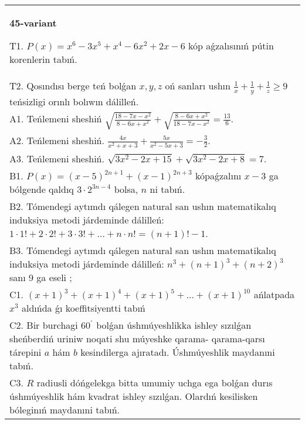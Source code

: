 \documentclass{article}
\begin{document}
\begin{tabular}{m{17cm}}
\textbf{45-variant}
\newline

T1. \(P(x) = x^{6} - 3x^{5} + x^{4} - 6x^{2} + 2x - 6\) kóp aǵzalısınıń pútin korenlerin tabıń. \\
T2. Qosındısı berge teń bolǵan \(x,y,z\) oń sanları ushın \(\frac{1}{x} + \frac{1}{y} + \frac{1}{z} \geq 9\) teńsizligi orınlı bolıwın dálilleń. \\
A1. Teńlemeni sheshiń \(\sqrt{\frac{18 - 7x - x^{2}}{8 - 6x + x^{2}}} + \sqrt{\frac{8 - 6x + x^{2}}{18 - 7x - x^{2}}} = \frac{13}{6}\). \\
A2. Teńlemeni sheshiń. \(\frac{4x}{x^{2} + x + 3} + \frac{5x}{x^{2} - 5x + 3} = - \frac{3}{2}\). \\
A3. Teńlemeni sheshiń. \(\sqrt{3x^{2} - 2x + 15} + \sqrt{3x^{2} - 2x + 8} = 7\). \\
B1. \(P(x) = (x - 5)^{2n + 1} + (x - 1)^{2n + 3}\) kópaǵzalını \(x - 3\) ga bólgende qaldıq \(3 \cdot 2^{3n - 4}\) bolsa, \(n\) ni tabıń. \\
B2. Tómendegi aytımdı qálegen natural san ushın matematikalıq induksiya metodi járdeminde dálilleń: \(1 \cdot 1! + 2 \cdot 2! + 3 \cdot 3! + \ldots + n \cdot n! = (n + 1)! - 1\). \\
B3. Tómendegi aytımdı qálegen natural san ushın matematikalıq induksiya metodi járdeminde dálilleń: \(n^{3} + (n + 1)^{3} + (n + 2)^{3}\) sanı 9 ga eseli ; \\
C1. \((x + 1)^{3} + (x + 1)^{4} + (x + 1)^{5} + ... + (x + 1)^{10}\) ańlatpada \(x^{3}\) aldıńda ǵı koeffitsiyentti tabıń \\
C2. Bir burchagi \(60^{{^\circ}}\) bolǵan úshmúyeshlikka ishley sızılǵan sheńberdiń uriniw noqati shu múyeshke qarama- qarama-qarsı tárepini \(a\) hám \(b\) kesindilerga ajıratadı. Úshmúyeshlik maydanıni tabıń. \\
C3. \(R\) radiusli dóńgelekga bitta umumiy uchga ega bolǵan durıs úshmúyeshlik hám kvadrat ishley sızılǵan. Olardıń kesilisken bóleginıń maydanıni tabıń. \\

\end{tabular}
\vspace{1cm}
\end{document}
